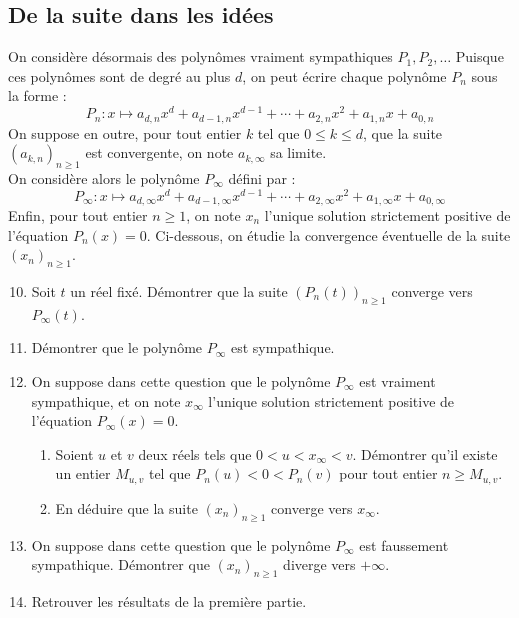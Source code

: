 \documentclass[landscape,twocolumn,leqno,a4paper,10pt]{report} %
\renewcommand{\geq}{\geqslant}
\begin{document}
\subsection{De la suite dans les idées}

On considère désormais des polynômes vraiment sympathiques $P_{1}, P_{2}, \ldots$ Puisque ces polynômes sont de degré au plus $d$, on peut écrire chaque polynôme $P_{n}$ sous la forme :
$$P_{n}: x \mapsto a_{d, n} x^{d}+a_{d-1, n} x^{d-1}+\cdots+a_{2, n} x^{2}+a_{1, n} x+a_{0, n}$$
On suppose en outre, pour tout entier $k$ tel que $0 \leqslant k \leqslant d$, que la suite $\left(a_{k, n}\right)_{n \geq 1}$ est convergente, on note $a_{k, \infty}$ sa limite.\\
On considère alors le polynôme $P_{\infty}$ défini par :
$$P_{\infty}: x \mapsto a_{d, \infty} x^{d}+a_{d-1, \infty} x^{d-1}+\cdots+a_{2, \infty} x^{2}+a_{1, \infty} x+a_{0, \infty}$$
Enfin, pour tout entier $n \geq 1$, on note $x_{n}$ l'unique solution strictement positive de l'équation $P_{n}(x)=0$. Ci-dessous, on étudie la convergence éventuelle de la suite $\left(x_{n}\right)_{n \geq 1}$.

\begin{enumerate}\setcounter{enumi}{9}
	\item Soit $t$ un réel fixé. Démontrer que la suite $\left(P_{n}(t)\right)_{n \geq 1}$ converge vers $P_{\infty}(t)$.
	\item Démontrer que le polynôme $P_{\infty}$ est sympathique.
	\item On suppose dans cette question que le polynôme $P_{\infty}$ est vraiment sympathique, et on note $x_{\infty}$ l'unique solution strictement positive de l'équation $P_{\infty}(x)=0$.
	\begin{enumerate}
		\item Soient $u$ et $v$ deux réels tels que $0<u<x_{\infty}<v$. Démontrer qu'il existe un entier $M_{u, v}$ tel que $P_{n}(u)<0<P_{n}(v)$ pour tout entier $n \geq M_{u, v}$.
		\item En déduire que la suite $\left(x_{n}\right)_{n \geq 1}$ converge vers $x_{\infty}$.
	\end{enumerate}
	\item On suppose dans cette question que le polynôme $P_{\infty}$ est faussement sympathique. Démontrer que $\left(x_{n}\right)_{n \geq 1}$ diverge vers $+\infty$.
	\item Retrouver les résultats de la première partie.
\end{enumerate}
\end{document}
